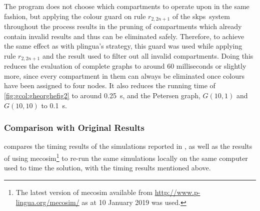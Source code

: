The \fsharp{} program does not choose which compartments to operate upon in the same fashion, but applying the colour guard on rule \(r_{2,2n+1}\) of the \gls{skps}~system throughout the process results in the pruning of compartments which already contain invalid results and thus can be eliminated safely. Therefore, to achieve the same effect as with \gls{plingua}'s strategy, this guard was used while applying rule \(r_{2,2n+1}\) and the result used to filter out all invalid compartments.  Doing this reduces the evaluation of complete graphs to around 60 milliseconds or slightly more, since every compartment in them can always be eliminated once colours have been assigned to four nodes.  It also reduces the running time of \cref{fig:gcol:gheorghefig2} to around \qty{0.25}{\second}, and the Petersen graph, \(G(10,1)\) and \(G(10,10)\) to \qty{0.1}{\second}.

\subsubsection{Comparison with Original Results}

 compares the timing results of the simulations reported in \cite{Gheorghe2013}, as well as the results of using \gls{mecosim}\footnote{The latest version of \gls{mecosim} available from \url{http://www.p-lingua.org/mecosim/} as at 10 January 2019 was used.} \cite{Perez-Hurtado2010} to re-run the same simulations locally on the same computer used to time the \fsharp{} solution, with the timing results mentioned above.

